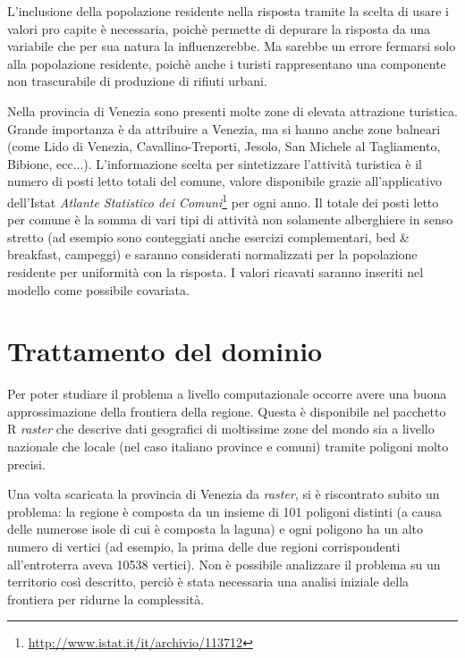 \documentclass[a4paper,11pt,twoside,openright]{book}							%
\begin{document}
L'inclusione della popolazione residente nella risposta tramite la scelta di usare i valori pro capite è necessaria, poichè permette di depurare la risposta da una variabile che per sua natura la influenzerebbe. Ma sarebbe un errore fermarsi solo alla popolazione residente, poichè anche i turisti rappresentano una componente non trascurabile di produzione di rifiuti urbani.

Nella provincia di Venezia sono presenti molte zone di elevata attrazione turistica. Grande importanza è da attribuire a Venezia, ma si hanno anche zone balneari (come Lido di Venezia, Cavallino-Treporti, Jesolo, San Michele al Tagliamento, Bibione, ecc...). L'informazione scelta per sintetizzare l'attività turistica è il numero di posti letto totali del comune, valore disponibile grazie all'applicativo dell'Istat \textit{Atlante Statistico dei Comuni}\footnote{\href{http://www.istat.it/it/archivio/113712}{http://www.istat.it/it/archivio/113712}} per ogni anno. Il totale dei posti letto per comune è la somma di vari tipi di attività non solamente alberghiere in senso stretto (ad esempio sono conteggiati anche esercizi complementari, bed \& breakfast, campeggi) e saranno considerati normalizzati per la popolazione residente per uniformità con la risposta. I valori ricavati saranno inseriti nel modello come possibile covariata.


\section{Trattamento del dominio}

Per poter studiare il problema a livello computazionale occorre avere una buona approssimazione della frontiera della regione. Questa è disponibile nel pacchetto R \textit{raster} che descrive dati geografici di moltissime zone del mondo sia a livello nazionale che locale (nel caso italiano province e comuni) tramite poligoni molto precisi.

Una volta scaricata la provincia di Venezia da \textit{raster}, si è riscontrato subito un problema: la regione è composta da un insieme di 101 poligoni distinti (a causa delle numerose isole di cui è composta la laguna) e ogni poligono ha un alto numero di vertici (ad esempio, la prima delle due regioni corrispondenti all'entroterra aveva 10538 vertici). Non è possibile analizzare il problema su un territorio così descritto, perciò è stata necessaria una analisi iniziale della frontiera per ridurne la complessità. 
\end{document}
